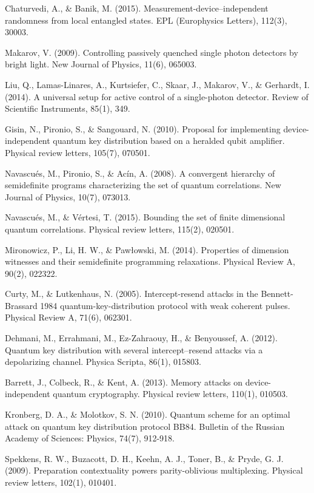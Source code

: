\documentclass[smallextended]{svjour3}
\begin{document}
\begin{thebibliography}{99}
 Chaturvedi, A., \& Banik, M. (2015). Measurement-device–independent randomness from local entangled states. EPL (Europhysics Letters), 112(3), 30003.

Makarov, V. (2009). Controlling passively quenched single photon detectors by bright light. New Journal of Physics, 11(6), 065003.

Liu, Q., Lamas-Linares, A., Kurtsiefer, C., Skaar, J., Makarov, V., \& Gerhardt, I. (2014). A universal setup for active control of a single-photon detector. Review of Scientific Instruments, 85(1), 349.

 Gisin, N., Pironio, S., \& Sangouard, N. (2010). Proposal for implementing device-independent quantum key distribution based on a heralded qubit amplifier. Physical review letters, 105(7), 070501.

 Navascu\'es, M., Pironio, S., \& Acín, A. (2008). A convergent hierarchy of semidefinite programs characterizing the set of quantum correlations. New Journal of Physics, 10(7), 073013.

 Navascués, M., \& Vértesi, T. (2015). Bounding the set of finite dimensional quantum correlations. Physical review letters, 115(2), 020501.

 Mironowicz, P., Li, H. W., \& Paw{\l}owski, M. (2014). Properties of dimension witnesses and their semidefinite programming relaxations. Physical Review A, 90(2), 022322.

 Curty, M., \& Lutkenhaus, N. (2005). Intercept-resend attacks in the Bennett-Brassard 1984 quantum-key-distribution protocol with weak coherent pulses. Physical Review A, 71(6), 062301.

 Dehmani, M., Errahmani, M., Ez-Zahraouy, H., \& Benyoussef, A. (2012). Quantum key distribution with several intercept–resend attacks via a depolarizing channel. Physica Scripta, 86(1), 015803.

 Barrett, J., Colbeck, R., \& Kent, A. (2013). Memory attacks on device-independent quantum cryptography. Physical review letters, 110(1), 010503.

 Kronberg, D. A., \& Molotkov, S. N. (2010). Quantum scheme for an optimal attack on quantum key distribution protocol BB84. Bulletin of the Russian Academy of Sciences: Physics, 74(7), 912-918.

 Spekkens, R. W., Buzacott, D. H., Keehn, A. J., Toner, B., \& Pryde, G. J. (2009). Preparation contextuality powers parity-oblivious multiplexing. Physical review letters, 102(1), 010401.



\end{thebibliography}
\end{document}
